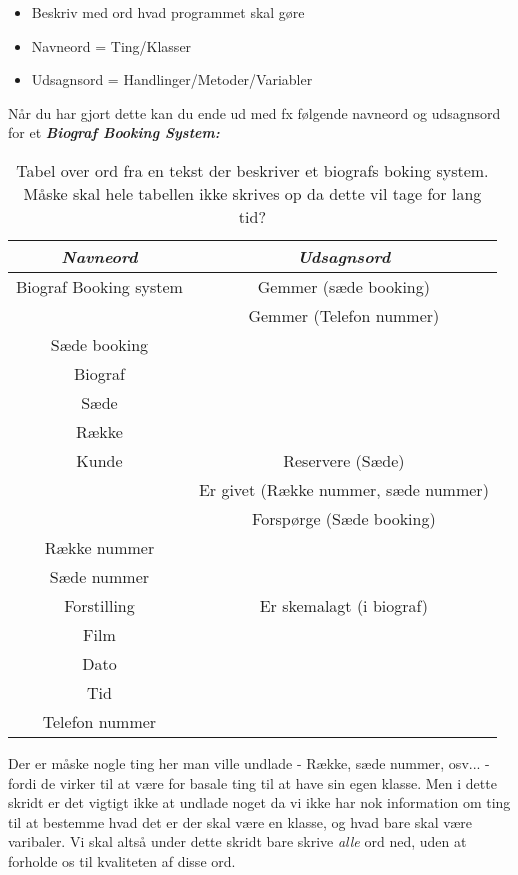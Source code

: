 \documentclass[a4paper,12pt]{article}
\newcommand{\textbfit}[1]{\textbf{\textit{#1}}}
\begin{document}
\begin{itemize}
    \item Beskriv med ord hvad programmet skal gøre
    \item Navneord = Ting/Klasser
    \item Udsagnsord = Handlinger/Metoder/Variabler
\end{itemize}

Når du har gjort dette kan du ende ud med fx følgende navneord og udsagnsord for et \textbfit{Biograf Booking System:}

\begin{table}[H]
    \centering
    \begin{tabular}{c c}
        \rowcolor{gray!30}
        \textbfit{Navneord} & \textbfit{Udsagnsord}  \\ \hline 
        Biograf Booking system  & Gemmer (sæde booking) \\
                                & Gemmer (Telefon nummer) \\
        Sæde booking            &  \\
        Biograf                 &  \\
        Sæde                    &  \\
        Række                   &  \\
        Kunde                   & Reservere (Sæde) \\
                                & Er givet (Række nummer, sæde nummer) \\
                                & Forspørge (Sæde booking) \\
        Række nummer            &  \\
        Sæde nummer             &  \\
        Forstilling             & Er skemalagt (i biograf) \\
        Film                    &  \\
        Dato                    &  \\
        Tid                     &  \\
        Telefon nummer          &
    \end{tabular}
    \caption{Tabel over ord fra en tekst der beskriver et biografs boking system. Måske skal hele tabellen ikke skrives op da dette vil tage for lang tid?}
\end{table}

Der er måske nogle ting her man ville undlade - Række, sæde nummer, osv... - fordi de virker til at være for basale ting til at have sin egen klasse. Men i dette skridt er det vigtigt ikke at undlade noget da vi ikke har nok information om ting til at bestemme hvad det er der skal være en klasse, og hvad bare skal være varibaler. Vi skal altså under dette skridt bare skrive \textit{alle} ord ned, uden at forholde os til kvaliteten af disse ord.
\end{document}
